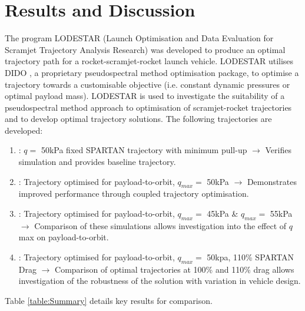 \documentclass[journal]{new-aiaa}
\begin{document}
\section{Results and Discussion} \label{section:results}
The program LODESTAR (Launch Optimisation and Data Evaluation for Scramjet Trajectory Analysis Research) was developed to produce an optimal trajectory path for a rocket-scramjet-rocket launch vehicle. LODESTAR utilises DIDO \cite{Ross,Ross2004}, a proprietary pseudospectral method optimisation package, to optimise a trajectory towards a customisable objective (i.e. constant dynamic pressures or optimal payload mass). 
LODESTAR is used to investigate the suitability of a pseudospectral method approach to optimisation of scramjet-rocket trajectories and to develop optimal trajectory solutions. The following trajectories are developed: 
\begin{enumerate}
	\item: $q = $ 50kPa fixed SPARTAN trajectory with minimum pull-up \newline$\rightarrow$ Verifies simulation and provides baseline trajectory.
	\item: Trajectory optimised for payload-to-orbit, $q_{max} = $ 50kPa \newline$\rightarrow$ Demonstrates improved performance through coupled trajectory optimisation.
	\item: Trajectory optimised for payload-to-orbit, $q_{max} = $ 45kPa \& $q_{max} = $ 55kPa \newline$\rightarrow$ Comparison of these simulations allows investigation into the effect of $q$ max on payload-to-orbit.
	\item: Trajectory optimised for payload-to-orbit,  $q_{max} = $ 50kpa, 110\% SPARTAN Drag \newline$\rightarrow$ Comparison of optimal trajectories at 100\% and 110\% drag allows investigation of the robustness of the solution with variation in vehicle design. 
\end{enumerate}

Table \ref{table:Summary} details key results for comparison. 
\end{document}

